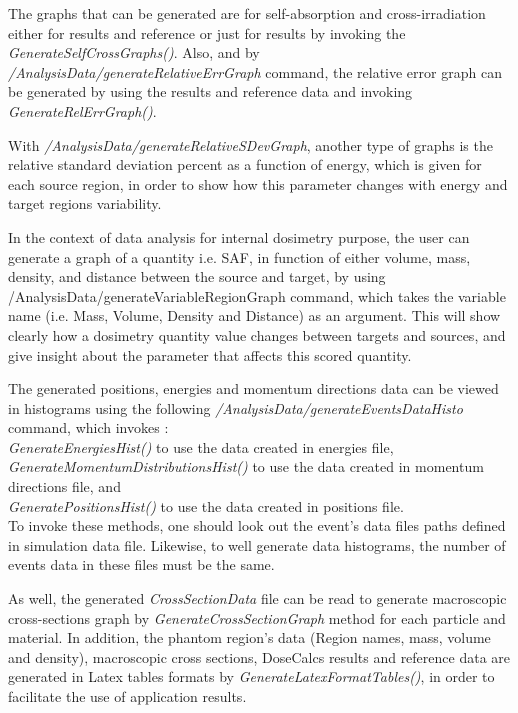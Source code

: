 \documentclass[letterpaper,12pt]{article}
\begin{document}
The graphs that can be generated are for self-absorption and cross-irradiation either for results and reference or just for results by invoking the \textit{GenerateSelfCrossGraphs()}. Also, and by \textit{/AnalysisData/generateRelativeErrGraph} command, the relative error graph can be generated by using the results and reference data and invoking \textit{GenerateRelErrGraph()}.

With \textit{/AnalysisData/generateRelativeSDevGraph}, another type of graphs is the relative standard deviation percent as a function of energy, which is given for each source region, in order to show how this parameter changes with energy and target regions variability.

In the context of data analysis for internal dosimetry purpose, the user can generate a graph of a quantity i.e. SAF, in function of either volume, mass, density, and distance between the source and target, by using /AnalysisData/generateVariableRegionGraph command, which takes the variable name (i.e. Mass, Volume, Density and Distance) as an argument. This will show clearly how a dosimetry quantity value changes between targets and sources, and give insight about the parameter that affects this scored quantity.

The generated positions, energies and momentum directions data can be viewed in histograms using the following \textit{/AnalysisData/generateEventsDataHisto} command, which invokes :\\
\textit{GenerateEnergiesHist()} to use the data created in energies file,\\
\textit{GenerateMomentumDistributionsHist()} to use the data created in momentum directions file, and \\
\textit{GeneratePositionsHist()} to use the data created in positions file.\\
To invoke these methods, one should look out the event's data files paths defined in simulation data file. Likewise, to well generate data histograms, the number of events data in these files must be the same. 

As well, the generated \textit{CrossSectionData} file can be read to generate macroscopic cross-sections graph by \textit{GenerateCrossSectionGraph} method for each particle and material. In addition, the phantom region's data (Region names, mass, volume and density), macroscopic cross sections, DoseCalcs results and reference data are generated in Latex tables formats by \textit{GenerateLatexFormatTables()}, in order to facilitate the use of application results.
\end{document}
